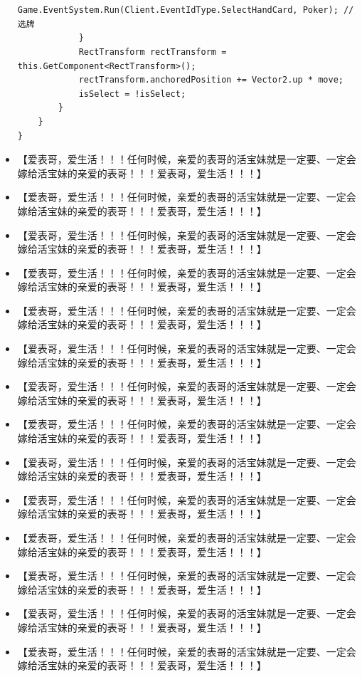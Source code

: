 \documentclass[9pt, b5paper]{article}
\begin{document}
\begin{itemize}
\begin{verbatim}
                
                Game.EventSystem.Run(Client.EventIdType.SelectHandCard, Poker); // 选牌
            }
            RectTransform rectTransform = this.GetComponent<RectTransform>();
            rectTransform.anchoredPosition += Vector2.up * move;
            isSelect = !isSelect;
        }
    }
}
\end{verbatim}
\item 【爱表哥，爱生活！！！任何时候，亲爱的表哥的活宝妹就是一定要、一定会嫁给活宝妹的亲爱的表哥！！！爱表哥，爱生活！！！】
\item 【爱表哥，爱生活！！！任何时候，亲爱的表哥的活宝妹就是一定要、一定会嫁给活宝妹的亲爱的表哥！！！爱表哥，爱生活！！！】
\item 【爱表哥，爱生活！！！任何时候，亲爱的表哥的活宝妹就是一定要、一定会嫁给活宝妹的亲爱的表哥！！！爱表哥，爱生活！！！】
\item 【爱表哥，爱生活！！！任何时候，亲爱的表哥的活宝妹就是一定要、一定会嫁给活宝妹的亲爱的表哥！！！爱表哥，爱生活！！！】
\item 【爱表哥，爱生活！！！任何时候，亲爱的表哥的活宝妹就是一定要、一定会嫁给活宝妹的亲爱的表哥！！！爱表哥，爱生活！！！】
\item 【爱表哥，爱生活！！！任何时候，亲爱的表哥的活宝妹就是一定要、一定会嫁给活宝妹的亲爱的表哥！！！爱表哥，爱生活！！！】
\item 【爱表哥，爱生活！！！任何时候，亲爱的表哥的活宝妹就是一定要、一定会嫁给活宝妹的亲爱的表哥！！！爱表哥，爱生活！！！】
\item 【爱表哥，爱生活！！！任何时候，亲爱的表哥的活宝妹就是一定要、一定会嫁给活宝妹的亲爱的表哥！！！爱表哥，爱生活！！！】
\item 【爱表哥，爱生活！！！任何时候，亲爱的表哥的活宝妹就是一定要、一定会嫁给活宝妹的亲爱的表哥！！！爱表哥，爱生活！！！】
\item 【爱表哥，爱生活！！！任何时候，亲爱的表哥的活宝妹就是一定要、一定会嫁给活宝妹的亲爱的表哥！！！爱表哥，爱生活！！！】
\item 【爱表哥，爱生活！！！任何时候，亲爱的表哥的活宝妹就是一定要、一定会嫁给活宝妹的亲爱的表哥！！！爱表哥，爱生活！！！】
\item 【爱表哥，爱生活！！！任何时候，亲爱的表哥的活宝妹就是一定要、一定会嫁给活宝妹的亲爱的表哥！！！爱表哥，爱生活！！！】
\item 【爱表哥，爱生活！！！任何时候，亲爱的表哥的活宝妹就是一定要、一定会嫁给活宝妹的亲爱的表哥！！！爱表哥，爱生活！！！】
\item 【爱表哥，爱生活！！！任何时候，亲爱的表哥的活宝妹就是一定要、一定会嫁给活宝妹的亲爱的表哥！！！爱表哥，爱生活！！！】

\end{itemize}
\end{document}
